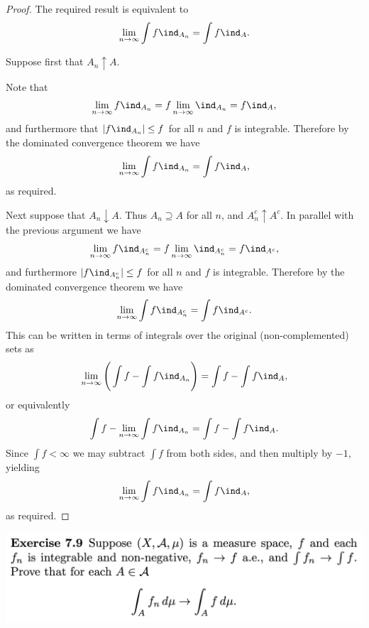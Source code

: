 \begin{proof}
  The required result is equivalent to
  \begin{align*}
    \limn \int f \ind_{A_n} = \int f \ind_A.
  \end{align*}

  Suppose first that $A_n \uparrow A$.

  Note that
  \begin{align*}
    \limn f\ind_{A_n} = f\limn\ind_{A_n} = f\ind_A,
  \end{align*}
  and furthermore that $|f\ind_{A_n}| \leq f$ for all $n$ and $f$ is integrable. Therefore by the dominated
  convergence theorem we have
  \begin{align*}
    \limn \int f \ind_{A_n} = \int f \ind_A,
  \end{align*}
  as required.

  Next suppose that $A_n \downarrow A$. Thus $A_n \supseteq A$ for all $n$, and $A_n^c \uparrow A^c$. In
  parallel with the previous argument we have
  \begin{align*}
    \limn f\ind_{A_n^c} = f\limn\ind_{A_n^c} = f\ind_{A^c},
  \end{align*}
  and furthermore $|f\ind_{A_n^c}| \leq f$ for all $n$ and $f$ is integrable.  Therefore by the dominated
  convergence theorem we have
  \begin{align*}
    \limn \int f \ind_{A_n^c} = \int f \ind_{A^c}.
  \end{align*}
  This can be written in terms of integrals over the original (non-complemented) sets as
  \begin{align*}
    \limn \Bigg(\int f - \int f \ind_{A_n}\Bigg) = \int f - \int f \ind_{A},
  \end{align*}
  or equivalently
  \begin{align*}
    \int f - \limn \int f \ind_{A_n} = \int f - \int f \ind_{A}.
  \end{align*}
  Since $\int f < \infty$ we may subtract $\int f$ from both sides, and then multiply by $-1$, yielding
  \begin{align*}
    \limn \int f \ind_{A_n} = \int f \ind_{A},
  \end{align*}
  as required.
\end{proof}

\begin{mdframed}
\includegraphics[width=400pt]{img/analysis--berkeley-202a-hw08-3203.png}
\end{mdframed}

